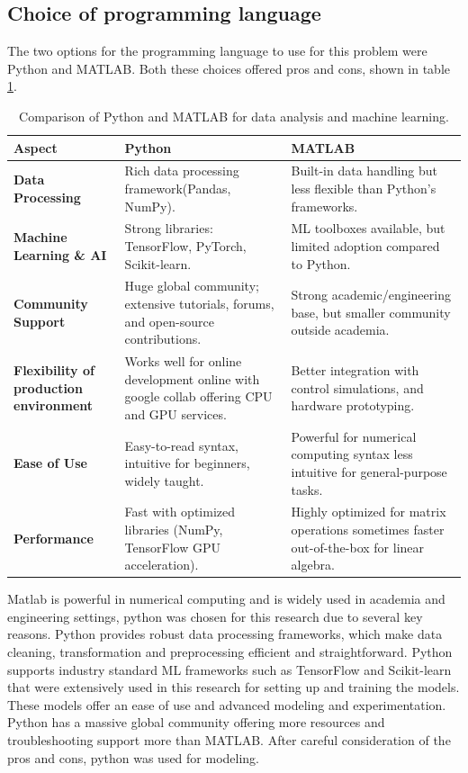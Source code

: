 \subsection{Choice of programming language}
The two options for the programming language to use for this problem were Python and MATLAB. Both these choices offered pros and cons, shown in table \ref{tab:python_matlab_comparison}.
\begin{table}[h!]
	\centering
	\renewcommand{\arraystretch}{1.8} %
	\caption{Comparison of Python and MATLAB for data analysis and machine learning.}
	\label{tab:python_matlab_comparison}
	\begin{tabular}{|p{3.5cm}|p{5.5cm}|p{5.5cm}|}
		\hline
		\textbf{Aspect} & \textbf{Python} & \textbf{MATLAB} \\
		\hline
		\textbf{Data Processing} & Rich data processing framework(Pandas, NumPy). & Built-in data handling but less flexible than Python’s frameworks. \\
		\hline
		\textbf{Machine Learning \& AI} & Strong libraries: TensorFlow, PyTorch, Scikit-learn. & ML toolboxes available, but limited adoption compared to Python. \\
		\hline
		\textbf{Community Support} & Huge global community; extensive tutorials, forums, and open-source contributions. & Strong academic/engineering base, but smaller community outside academia. \\
		\hline
		\textbf{Flexibility of production environment} & Works well for online development online with google collab offering CPU and GPU services. & Better integration with control simulations, and hardware prototyping. \\
		\hline
		\textbf{Ease of Use} & Easy-to-read syntax, intuitive for beginners, widely taught. & Powerful for numerical computing syntax less intuitive for general-purpose tasks. \\
		\hline
		\textbf{Performance} & Fast with optimized libraries (NumPy, TensorFlow GPU acceleration). & Highly optimized for matrix operations sometimes faster out-of-the-box for linear algebra. \\
		\hline
	\end{tabular}
	
\end{table}

Matlab is powerful in numerical computing and is widely used in academia and engineering settings, python was chosen for this research due to several key reasons. Python provides robust data processing frameworks, which make data cleaning, transformation and preprocessing efficient and straightforward. Python supports industry standard ML frameworks such as TensorFlow and Scikit-learn that were extensively used in this research for setting up and training the models. These models offer an ease of use and advanced modeling and experimentation. Python has a massive global community offering more resources and troubleshooting support more than MATLAB. After careful consideration of the pros and cons, python was used for modeling.

